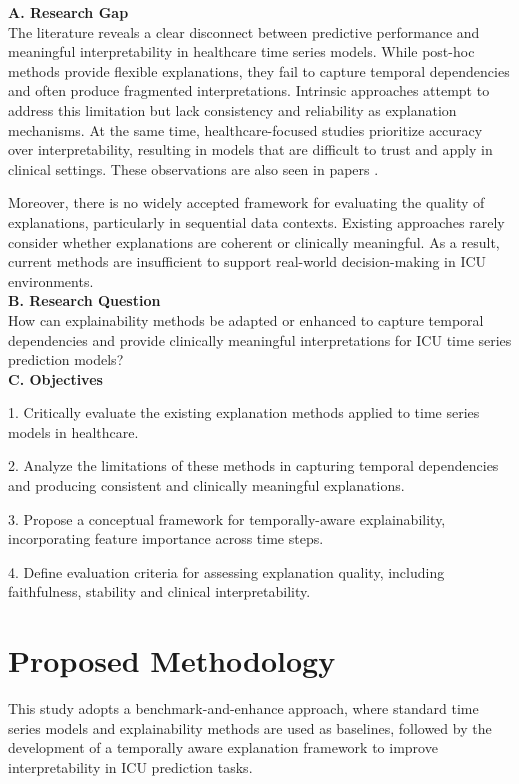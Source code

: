 \documentclass[conference]{IEEEtran}
\begin{document}
\textbf{A.	Research Gap}\\
The literature reveals a clear disconnect between predictive performance and meaningful interpretability in healthcare time series models. While post-hoc methods provide flexible explanations, they fail to capture temporal dependencies and often produce fragmented interpretations. Intrinsic approaches attempt to address this limitation but lack consistency and reliability as explanation mechanisms. At the same time, healthcare-focused studies prioritize accuracy over interpretability, resulting in models that are difficult to trust and apply in clinical settings. These observations are also seen in papers \cite{arrieta2020xai,wachter2017counterfactual,guidotti2018survey,hewamalage2021forecasting,tonekaboni2019clinicians,topol2019aihealthcare}.

Moreover, there is no widely accepted framework for evaluating the quality of explanations, particularly in sequential data contexts. Existing approaches rarely consider whether explanations are coherent or clinically meaningful. As a result, current methods are insufficient to support real-world decision-making in ICU environments.\\

\textbf{B.	Research Question}\\
How can explainability methods be adapted or enhanced to capture temporal dependencies and provide clinically meaningful interpretations for ICU time series prediction models?\\

\textbf{C.	Objectives}

1. Critically evaluate the existing explanation methods applied to time series models in healthcare.

2. Analyze the limitations of these methods in capturing temporal dependencies and producing consistent and clinically meaningful explanations.

3.	Propose a conceptual framework for temporally-aware explainability, incorporating feature importance across time steps.

4.	Define evaluation criteria for assessing explanation quality, including faithfulness, stability and clinical interpretability.



\section{Proposed Methodology}
This study adopts a benchmark-and-enhance approach, where standard time series models and explainability methods are used as baselines, followed by the development of a temporally aware explanation framework to improve interpretability in ICU prediction tasks.\\
\end{document}
